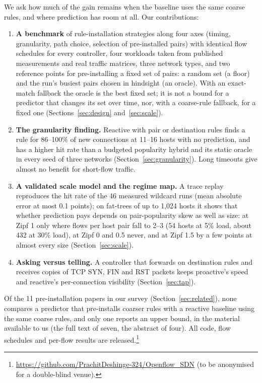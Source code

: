 \documentclass[conference]{IEEEtran}
\begin{document}
We ask how much of the gain remains when the baseline uses the same coarse rules, and where prediction has room at all. Our contributions:
\begin{enumerate}
\item \textbf{A benchmark} of rule-installation strategies along four axes (timing, granularity, path choice, selection of pre-installed pairs) with identical flow schedules for every controller, four workloads taken from published measurements and real traffic matrices, three network types, and two reference points for pre-installing a fixed set of pairs: a random set (a floor) and the run's busiest pairs chosen in hindsight (an oracle). With an exact-match fallback the oracle is the best fixed set; it is not a bound for a predictor that changes its set over time, nor, with a coarse-rule fallback, for a fixed one (Sections~\ref{sec:design} and~\ref{sec:scale}).
\item \textbf{The granularity finding.} Reactive with pair or destination rules finds a rule for 86--100\% of new connections at 11--16 hosts with no prediction, and has a higher hit rate than a budgeted popularity hybrid and its static oracle in every seed of three networks (Section~\ref{sec:granularity}). Long timeouts give almost no benefit for short-flow traffic.
\item \textbf{A validated scale model and the regime map.} A trace replay reproduces the hit rate of the 46 measured wildcard runs (mean absolute error at most 0.1 points); on fat-trees of up to 1,024 hosts it shows that whether prediction pays depends on pair-popularity skew as well as size: at Zipf 1 only where flows per host pair fall to 2--3 (54 hosts at 5\% load, about 432 at 30\% load), at Zipf 0 and 0.5 never, and at Zipf 1.5 by a few points at almost every size (Section~\ref{sec:scale}).
\item \textbf{Asking versus telling.} A controller that forwards on destination rules and receives copies of TCP SYN, FIN and RST packets keeps proactive's speed and reactive's per-connection visibility (Section~\ref{sec:tap}).
\end{enumerate}
Of the 11 pre-installation papers in our survey (Section~\ref{sec:related}), none compares a predictor that pre-installs coarser rules with a reactive baseline using the same coarse rules, and only one reports an upper bound, in the material available to us (the full text of seven, the abstract of four). All code, flow schedules and per-flow results are released.\footnote{\url{https://github.com/PrachitDeshinge-324/Openflow_SDN} (to be anonymised for a double-blind venue).}
\end{document}
